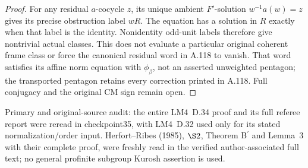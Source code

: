 \begin{proof}
For any residual \(a\)-cocycle \(z\), its unique ambient
\(F'\)-solution \(w^{-1}a(w)=z\) gives its precise obstruction
label \(wR\). The equation has a solution in \(R\) exactly
when that label is the identity. Nonidentity odd-unit labels
therefore give nontrivial actual classes.
This does not evaluate a particular original coherent
frame class or force the canonical residual word in A.118
to vanish. That word satisfies its affine norm equation
with \(\phi_\beta\), not an asserted unweighted pentagon;
the transported pentagon retains every correction printed
in A.118. Full conjugacy and the original CM sign remain open.
\end{proof}

\begingroup\footnotesize\raggedright
Primary and original-source audit: the entire LM4~D.34 proof
and its full referee report were reread in checkpoint35, with
LM4~D.32 used only for its stated normalization/order input.
Herfort--Ribes (1985), \(\S2\), Theorem B\(^{\prime}\) and
Lemma~3 with their complete proof, were freshly read in the
verified author-associated full text; no general profinite
subgroup Kurosh assertion is used.\par\endgroup
